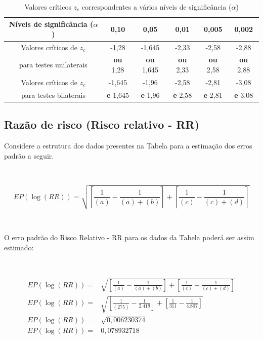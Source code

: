 \documentclass[
]{book}
\begin{document}
~

\begin{table}[h]
\centering
\caption{Valores críticos $z_{c}$ correspondentes a vários níveis de significância ($\alpha$)}
\begin{tabular}{|c|c|c|c|c|c|}
\hline 
Níveis de significância ($\alpha$) & 0,10 & 0,05 & 0,01 & 0,005 & 0,002 \\ 
\hline 
Valores críticos de $z_{c}$  & -1,28  & -1,645  & -2,33  & -2,58  &  -2,88 \\
    para testes unilaterais &  \textbf{ou} 1,28 & \textbf{ou} 1,645   &  \textbf{ou} 2,33 & \textbf{ou} 2,58  &  \textbf{ou} 2,88 \\
\hline 
Valores críticos de $z_{c}$  & -1,645 & -1,96  & -2,58  & -2,81  &  -3,08 \\
    para testes bilaterais &  \textbf{e} 1,645 & \textbf{e} 1,96   &  \textbf{e} 2,58 & \textbf{e} 2,81  &  \textbf{e} 3,08 \\
\hline
\end{tabular}
\end{table}

\hfill\break

\hypertarget{razuxe3o-de-risco-risco-relativo---rr-1}{%
\subsection{Razão de risco (Risco relativo - RR)}\label{razuxe3o-de-risco-risco-relativo---rr-1}}

\hfill\break

Considere a estrutura dos dados presentes na Tabela para a estimação dos erros padrão a seguir.

~

\[
EP(\log(RR)) = \sqrt{ \left[  \frac{1}{(a)} - \frac{1}{(a) + (b)} \right] + \left[ \frac{1}{(c)} - \frac{1}{(c)+(d)} \right]}
\]

~

O erro padrão do Risco Relativo - RR para os dados da Tabela poderá ser assim estimado:

~

\begin{align*}
EP(\log(RR)) = & \sqrt{ \left[  \frac{1}{(a)} - \frac{1}{(a) + (b)} \right] + \left[ \frac{1}{(c)} - \frac{1}{(c)+(d)} \right]  }\\
EP(\log(RR)) = & \sqrt{ \left[  \frac{1}{(275)} - \frac{1}{2.419} \right] + \left[ \frac{1}{311} - \frac{1}{4.807} \right]  }\\
EP(\log(RR)) = & \sqrt{0,006230374} \\
EP(\log(RR)) = & 0,078932718
\end{align*}
\end{document}

